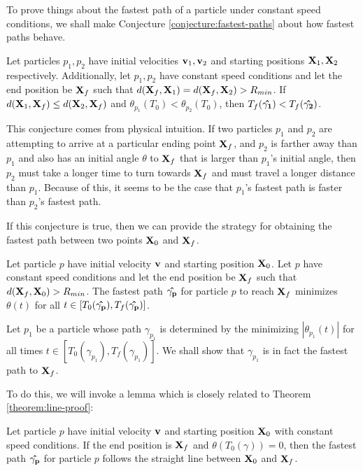 To prove things about the fastest path of a particle under constant speed conditions, we shall make Conjecture \ref{conjecture:fastest-paths} about how fastest paths behave.

\begin{conjecture}
  \label{conjecture:fastest-paths}
  Let particles $p_1, p_2$ have initial velocities $\mathbf{v}_1, \mathbf{v}_2$ and starting positions $\mathbf{X}_1, \mathbf{X}_2$ respectively. Additionally, let $p_1, p_2$ have constant speed conditions and let the end position be $\mathbf{X}_f$ such that $d(\mathbf{X}_f, \mathbf{X}_1) = d(\mathbf{X}_f, \mathbf{X}_2) > R_{min}$. If $d(\mathbf{X}_1, \mathbf{X}_f) \leq d(\mathbf{X}_2, \mathbf{X}_f)$ and $\theta_{p_1}(T_0) < \theta_{p_2}(T_0)$, then $T_f(\mathbf{\hat{\gamma_1}}) < T_f(\mathbf{\hat{\gamma_2}})$.
\end{conjecture}

This conjecture comes from physical intuition. If two particles $p_1$ and $p_2$ are attempting to arrive at a particular ending point $\mathbf{X}_f$, and $p_2$ is farther away than $p_1$ and also has an initial angle $\theta$ to $\mathbf{X}_f$ that is larger than $p_1$'s initial angle, then $p_2$ must take a longer time to turn towards $\mathbf{X}_f$ and must travel a longer distance than $p_1$. Because of this, it seems to be the case that $p_1$'s fastest path is faster than $p_2$'s fastest path.

If this conjecture is true, then we can provide the strategy for obtaining the fastest path between two points $\mathbf{X}_0$ and $\mathbf{X}_f$.

\begin{theorem}
  Let particle $p$ have initial velocity $\mathbf{v}$ and starting position $\mathbf{X}_0$. Let $p$ have constant speed conditions and let the end position be $\mathbf{X}_f$ such that $d(\mathbf{X}_f, \mathbf{X}_0) > R_{min}$. The fastest path $\mathbf{\hat{\gamma_p}}$ for particle $p$ to reach $\mathbf{X}_f$ minimizes $\theta(t)$ for all $t \in [T_0(\mathbf{\hat{\gamma_p}}), T_f(\mathbf{\hat{\gamma_p}})]$.
  \label{theorem:restricted-theta}
\end{theorem}
\proof Let $p_1$ be a particle whose path $\gamma_{p_1}$ is determined by the minimizing $|\theta_{p_1}(t)|$ for all times $t \in [T_0(\gamma_{p_1}), T_f(\gamma_{p_1})]$. We shall show that $\gamma_{p_1}$ is in fact the fastest path to $\mathbf{X}_f$.

To do this, we will invoke a lemma which is closely related to Theorem \ref{theorem:line-proof}:

\begin{lemma}
  Let particle $p$ have initial velocity $\mathbf{v}$ and starting position $\mathbf{X}_0$ with constant speed conditions. If the end position is $\mathbf{X}_f$ and $\theta(T_0(\gamma)) = 0$, then the fastest path $\mathbf{\hat{\gamma_p}}$ for particle $p$ follows the straight line between $\mathbf{X}_0$ and $\mathbf{X}_f$.
\end{lemma}

